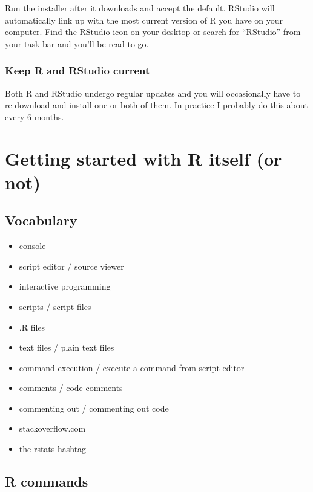 \documentclass[
]{book}
\providecommand{\tightlist}{%
  \setlength{\itemsep}{0pt}\setlength{\parskip}{0pt}}
\begin{document}
Run the installer after it downloads and accept the default. RStudio will automatically link up with the most current version of R you have on your computer. Find the RStudio icon on your desktop or search for ``RStudio'' from your task bar and you'll be read to go.

\hypertarget{keep-r-and-rstudio-current}{%
\subsection{Keep R and RStudio current}\label{keep-r-and-rstudio-current}}

Both R and RStudio undergo regular updates and you will occasionally have to re-download and install one or both of them. In practice I probably do this about every 6 months.

\hypertarget{getting-started-with-r-itself-or-not}{%
\chapter*{Getting started with R itself (or not)}\label{getting-started-with-r-itself-or-not}}

\hypertarget{vocabulary-3}{%
\section*{Vocabulary}\label{vocabulary-3}}

\begin{itemize}
\tightlist
\item
  console
\item
  script editor / source viewer
\item
  interactive programming
\item
  scripts / script files
\item
  .R files
\item
  text files / plain text files
\item
  command execution / execute a command from script editor
\item
  comments / code comments
\item
  commenting out / commenting out code
\item
  stackoverflow.com
\item
  the rstats hashtag
\end{itemize}

\hypertarget{r-commands}{%
\section*{R commands}\label{r-commands}}
\end{document}
